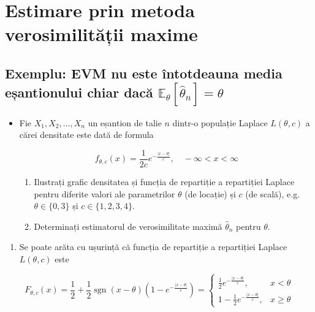 \documentclass[]{article}
\providecommand{\tightlist}{%
  \setlength{\itemsep}{0pt}\setlength{\parskip}{0pt}}
\newenvironment{frshaded*}{%
  \def\FrameCommand{\fboxrule=\FrameRule\fboxsep=\FrameSep \fcolorbox{framecolor}{shadecolor1}}%
  \MakeFramed {\advance\hsize-\width \FrameRestore}}%
{\endMakeFramed}
\newenvironment{rmdblock}[1]
  {\begin{frshaded*}
  \begin{itemize}
  \renewcommand{\labelitemi}{
    \raisebox{-.7\height}[0pt][0pt]{
      {\setkeys{Gin}{width=2em,keepaspectratio}\texttt{[image: images/icons/\#1]}}
    }
  }
  \item
  }
  {
  \end{itemize}
  \end{frshaded*}
  }
\newcounter{exo}[section]
\newenvironment{rmdexercise}
  {\begin{rmdblock}{exercise}}
  {\end{rmdblock}}
\begin{document}
\section{Estimare prin metoda verosimilității
maxime}\label{estimare-prin-metoda-verosimilitatii-maxime}

\subsection{\texorpdfstring{Exemplu: EVM nu este întotdeauna media
eșantionului chiar dacă
\(\mathbb{E}_{\theta}[\hat{\theta}_n] = \theta\)}{Exemplu: EVM nu este întotdeauna media eșantionului chiar dacă \textbackslash{}mathbb\{E\}\_\{\textbackslash{}theta\}{[}\textbackslash{}hat\{\textbackslash{}theta\}\_n{]} = \textbackslash{}theta}}\label{exemplu-evm-nu-este-intotdeauna-media-esantionului-chiar-daca-mathbbe_thetahattheta_n-theta}

\begin{rmdexercise}
Fie \(X_1,X_2,\ldots,X_n\) un eșantion de talie \(n\) dintr-o populație
Laplace \(L(\theta, c)\) a cărei densitate este dată de formula

\[
  f_{\theta, c}(x) = \frac{1}{2c}e^{-\frac{|x-\theta|}{c}}, \quad -\infty<x<\infty
\]

\begin{enumerate}
\def\labelenumi{\alph{enumi})}
\item
  Ilustrați grafic densitatea și funcția de repartiție a repartiției
  Laplace pentru diferite valori ale parametrilor \(\theta\) (de
  locație) și \(c\) (de scală), e.g. \(\theta\in\{0, 3\}\) și
  \(c\in\{1,2,3,4\}\).
\item
  Determinați estimatorul de verosimilitate maximă \(\hat{\theta}_n\)
  pentru \(\theta\).
\end{enumerate}
\end{rmdexercise}

\begin{enumerate}
\def\labelenumi{\alph{enumi})}
\tightlist
\item
  Se poate arăta cu ușurință că funcția de repartiție a repartiției
  Laplace \(L(\theta, c)\) este
\end{enumerate}

\[
  F_{\theta, c}(x) = \frac{1}{2} + \frac{1}{2}\operatorname{sgn}(x-\theta)\left(1-e^{-\frac{|x-\theta|}{c}}\right) = \left\{\begin{array}{ll}
    \frac{1}{2}e^{-\frac{|x-\theta|}{c}}, & x<\theta\\
    1-\frac{1}{2}e^{-\frac{|x-\theta|}{c}}, & x\geq\theta
  \end{array}\right.
\]
\end{document}
